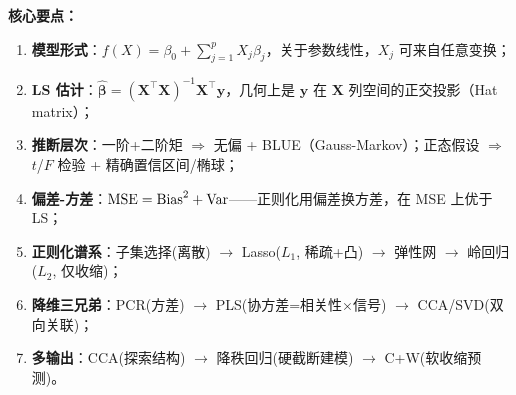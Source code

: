 \medskip
\noindent
\textbf{核心要点：}
\begin{enumerate}
    \item \textbf{模型形式}：$f(X)=\beta_0+\sum_{j=1}^{p}X_j\beta_j$，关于参数线性，$X_j$ 可来自任意变换；
    \item \textbf{LS 估计}：$\hat{\bm{\beta}}=(\mathbf{X}^\top\mathbf{X})^{-1}\mathbf{X}^\top\mathbf{y}$，几何上是 $\mathbf{y}$ 在 $\mathbf{X}$ 列空间的正交投影（Hat matrix）；
    \item \textbf{推断层次}：一阶+二阶矩 $\Rightarrow$ 无偏 + BLUE（Gauss-Markov）；正态假设 $\Rightarrow$ $t$/$F$ 检验 + 精确置信区间/椭球；
    \item \textbf{偏差-方差}：$\mathrm{MSE}=\mathrm{Bias}^2+\mathrm{Var}$——正则化用偏差换方差，在 MSE 上优于 LS；
    \item \textbf{正则化谱系}：子集选择(离散) $\to$ Lasso($L_1$, 稀疏+凸) $\to$ 弹性网 $\to$ 岭回归($L_2$, 仅收缩)；
    \item \textbf{降维三兄弟}：PCR(方差) $\to$ PLS(协方差=相关性$\times$信号) $\to$ CCA/SVD(双向关联)；
    \item \textbf{多输出}：CCA(探索结构) $\to$ 降秩回归(硬截断建模) $\to$ C+W(软收缩预测)。
\end{enumerate}

